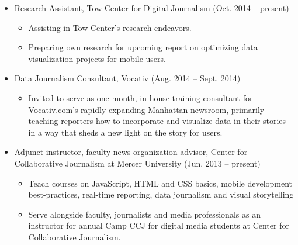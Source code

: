 \documentclass{article}
\begin{document}
\begin{itemize}[noitemsep,topsep=\mdcompacttopsep]%

\item{}Research Assistant, Tow Center for Digital Journalism (Oct. 2014 – present)

\begin{itemize}[noitemsep,topsep=\mdcompacttopsep]%

\item{}Assisting in Tow Center's research endeavors.%

\item{}Preparing own research for upcoming report on optimizing data visualization projects for mobile users.%
\end{itemize}%

\item{}Data Journalism Consultant, Vocativ (Aug. 2014 – Sept. 2014)

\begin{itemize}[noitemsep,topsep=\mdcompacttopsep]%

\item{}Invited to serve as one-month, in-house training consultant for Vocativ.com's rapidly expanding Manhattan newsroom, primarily teaching reporters how to incorporate and visualize data in their stories in a way that sheds a new light on the story for users.%
\end{itemize}%

\item{}Adjunct instructor, faculty news organization advisor, Center for Collaborative Journalism at Mercer University (Jun. 2013 – present)

\begin{itemize}[noitemsep,topsep=\mdcompacttopsep]%

\item{}Teach courses on JavaScript, HTML and CSS basics, mobile development best-practices, real-time reporting, data journalism and visual storytelling%

\item{}Serve alongside faculty, journalists and media professionals as an instructor for annual Camp CCJ for digital media students at Center for Collaborative Journalism.%


\end{itemize}
\end{itemize}
\end{document}
